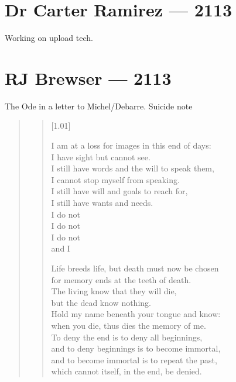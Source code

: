 \chapter*{Dr Carter Ramirez — 2113}

Working on upload tech.

\chapter*{RJ Brewser — 2113}

The Ode in a letter to Michel/Debarre. Suicide note

\begin{quote}

  \begin{verse}[1.01\textwidth]

    I am at a loss for images in this end of days:\\
    I have sight but cannot see.\\
    I still have words and the will to speak them,\\
    I cannot stop myself from speaking.\\
    I still have will and goals to reach for,\\
    I still have wants and needs.\\
    I do not\\
    I do not\\
    I do not\\
    and I

    Life breeds life, but death must now be chosen\\
    for memory ends at the teeth of death.\\
    The living know that they will die,\\
    but the dead know nothing.\\
    Hold my name beneath your tongue and know:\\
    when you die, thus dies the memory of me.\\
    To deny the end is to deny all beginnings,\\
    and to deny beginnings is to become immortal,\\
    and to become immortal is to repeat the past,\\
    which cannot itself, in the end, be denied.



\end{verse}
\end{quote}
